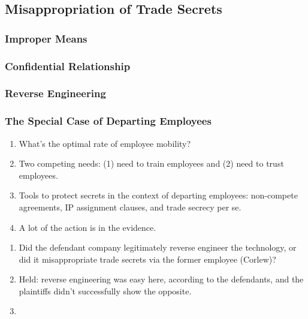 
\subsection{Misappropriation of Trade Secrets}

\subsubsection{Improper Means}


\subsubsection{Confidential Relationship}


\subsubsection{Reverse Engineering}


\subsubsection{The Special Case of Departing Employees}


\begin{enumerate}
    \item What's the optimal rate of employee mobility?
    \item Two competing needs: (1) need to train employees and (2) need to 
    trust employees.
    \item Tools to protect secrets in the context of departing employees: 
    non-compete agreements, IP assignment clauses, and trade secrecy per se.
    \item A lot of the action is in the evidence.
\end{enumerate}


\begin{enumerate}
    \item Did the defendant company legitimately reverse engineer the 
    technology, or did it misappropriate trade secrets via the former 
    employee (Corlew)?
    \item Held: reverse engineering was easy here, according to the 
    defendants, and the plaintiffs didn't successfully show the opposite.  
    \item 
\end{enumerate}

